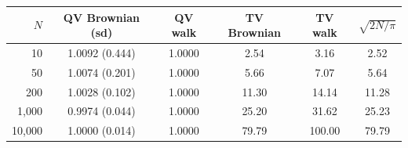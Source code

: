 \begin{tabular}{rccccc}
\toprule
$N$ & QV Brownian (sd) & QV walk & TV Brownian & TV walk & $\sqrt{2N/\pi}$ \\
\midrule
10 & 1.0092 (0.444) & 1.0000 & 2.54 & 3.16 & 2.52 \\
50 & 1.0074 (0.201) & 1.0000 & 5.66 & 7.07 & 5.64 \\
200 & 1.0028 (0.102) & 1.0000 & 11.30 & 14.14 & 11.28 \\
1,000 & 0.9974 (0.044) & 1.0000 & 25.20 & 31.62 & 25.23 \\
10,000 & 1.0000 (0.014) & 1.0000 & 79.79 & 100.00 & 79.79 \\
\bottomrule
\end{tabular}
